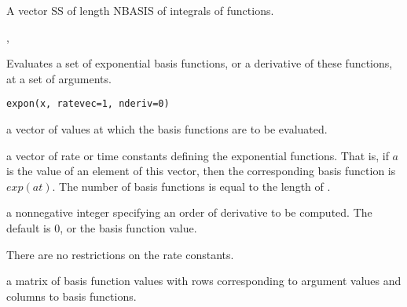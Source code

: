 \documentclass{article}
\begin{document}
\begin{Value}
A vector SS of length NBASIS of integrals of functions.
\end{Value}
\begin{SeeAlso}\relax
{},
\end{SeeAlso}

\begin{Description}\relax
Evaluates a set of exponential basis functions, or a derivative of these
functions, at a set of arguments.
\end{Description}
\begin{Usage}
\begin{verbatim}
expon(x, ratevec=1, nderiv=0)
\end{verbatim}
\end{Usage}
\begin{Arguments}
\begin{ldescription}
\item[\code{x}] a vector of values at which the basis functions are to be evaluated.

\item[\code{ratevec}] a vector of rate or time constants defining the exponential
functions.  That is, if $a$ is the value of an
element of this vector, then the corresponding basis function
is $exp(at)$. The number of basis functions is equal
to the length of .

\item[\code{nderiv}] a nonnegative integer specifying an order of derivative to
be computed.  The default is 0, or the basis function value.

\end{ldescription}
\end{Arguments}
\begin{Details}\relax
There are no restrictions on the rate constants.
\end{Details}
\begin{Value}
a matrix of basis function values with rows corresponding
to argument values and columns to basis functions.
\end{Value}
\begin{SeeAlso}\relax
{}
\end{SeeAlso}
\end{document}
